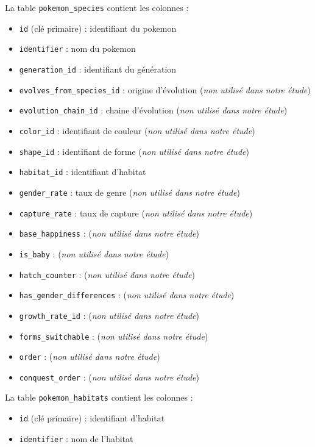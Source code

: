 La table \texttt{pokemon\_species} contient les colonnes :

\begin{itemize}[itemsep=0mm]
	\item \texttt{id} (clé primaire) : identifiant du pokemon 
	\item \texttt{identifier} : nom du pokemon
	\item \texttt{generation\_id} : identifiant du génération 
	\item \texttt{evolves\_from\_species\_id} : origine d'évolution (\emph{non utilisé dans notre étude})
	\item \texttt{evolution\_chain\_id} : chaine d'évolution (\emph{non utilisé dans notre étude})
	\item \texttt{color\_id} : identifiant de couleur (\emph{non utilisé dans notre étude})
	\item \texttt{shape\_id} : identifiant de forme (\emph{non utilisé dans notre étude})
	\item \texttt{habitat\_id} : identifiant d'habitat
	\item \texttt{gender\_rate} : taux de genre (\emph{non utilisé dans notre étude})
	\item \texttt{capture\_rate} : taux de capture (\emph{non utilisé dans notre étude})
	\item \texttt{base\_happiness} : (\emph{non utilisé dans notre étude})
	\item \texttt{is\_baby} : (\emph{non utilisé dans notre étude})
	\item \texttt{hatch\_counter} : (\emph{non utilisé dans notre étude})
	\item \texttt{has\_gender\_differences} : (\emph{non utilisé dans notre étude})
	\item \texttt{growth\_rate\_id} : (\emph{non utilisé dans notre étude})
	\item \texttt{forms\_switchable} : (\emph{non utilisé dans notre étude})
	\item \texttt{order} : (\emph{non utilisé dans notre étude})
	\item \texttt{conquest\_order} : (\emph{non utilisé dans notre étude})
\end{itemize}


La table \texttt{pokemon\_habitats} contient les colonnes :

\begin{itemize}[itemsep=0mm]
	\item \texttt{id} (clé primaire) : identifiant d'habitat
	\item \texttt{identifier} : nom de l'habitat
\end{itemize}

